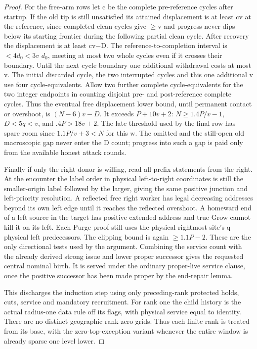 \begin{proof}
For the free-arm rows let c be the complete pre-reference cycles after startup. If the old tip is still unsatisfied its attained displacement is at least cv at the reference, since completed clean cycles give \(\ge\)v and progress never dips below its starting frontier during the following partial clean cycle. After recovery the displacement is at least cv\(-\)D. The reference-to-completion interval is \(<4d_0<3v\) \(d_0\), meeting at most two whole cycles even if it crosses their boundary. Until the next cycle boundary one additional withdrawal costs at most v. The initial discarded cycle, the two interrupted cycles and this one additional v use four cycle-equivalents. Allow two further complete cycle-equivalents for the two integer endpoints in counting disjoint pre- and post-reference complete cycles. Thus the eventual free displacement lower bound, until permanent contact or overshoot, is \((N- 6)v- D\). It exceeds \(P+10v+2\): \(N\ge 1.4P/v- 1\), \(D<5q<v\), and \(.4P>18v+2\). The late threshold used by the final row has spare room since \(1.1P/v+3<N\) for this w. The omitted and the still-open old macroscopic gap never enter the D count; progress into such a gap is paid only from the available honest attack rounds.

Finally if only the right donor is willing, read all prefix statements from the right. At the encounter the label order in physical left-to-right coordinates is still the smaller-origin label followed by the larger, giving the same positive junction and left-priority resolution. A reflected free right worker has legal decreasing addresses beyond its own left edge until it reaches the reflected overshoot. A homeward end of a left source in the target has positive extended address and true Grow cannot kill it on its left. Each Purge proof still uses the physical rightmost site's q physical left predecessors. The clipping bound is again \(\ge\)\(1.1P- 2\). These are the only directional tests used by the argument. Combining the service count with the already derived strong issue and lower proper successor gives the requested central nominal birth. It is served under the ordinary proper-live service clause, once the positive successor has been made proper by the end-repair lemma.

This discharges the induction step using only preceding-rank protected holds, cuts, service and mandatory recruitment. For rank one the child history is the actual radius-one data rule off its flags, with physical service equal to identity. There are no distinct geographic rank-zero grids. Thus each finite rank is treated from its base, with the zero-top-exception variant whenever the entire window is already sparse one level lower.
\end{proof}

